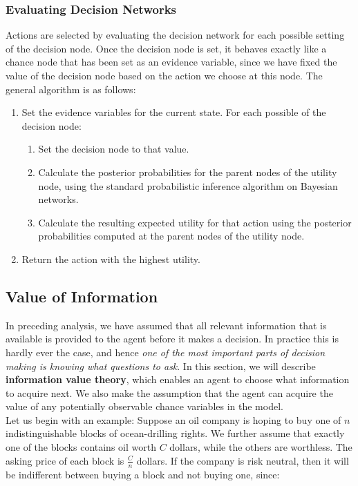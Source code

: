 \documentclass[11pt]{article}
\begin{document}
\subsubsection{Evaluating Decision Networks}

Actions are selected by evaluating the decision network for each possible setting of the decision node. Once the decision node is set, it behaves exactly like a chance node that has been set as an evidence variable, since we have fixed the value of the decision node based on the action we choose at this node. The general algorithm is as follows:

\begin{enumerate}
    \item Set the evidence variables for the current state.
    For each possible of the decision node:
    \begin{enumerate}
        \item Set the decision node to that value.
        \item Calculate the posterior probabilities for the parent nodes of the utility node, using the standard probabilistic inference algorithm on Bayesian networks.
        \item Calculate the resulting expected utility for that action using the posterior probabilities computed at the parent nodes of the utility node.
    \end{enumerate}
    \item Return the action with the highest utility.
\end{enumerate}

\subsection{Value of Information}
In preceding analysis, we have assumed that all relevant information that is available is provided to the agent before it makes a decision. In practice this is hardly ever the case, and hence \textit{one of the most important parts of decision making is knowing what questions to ask}. In this section, we will describe \textbf{information value theory}, which enables an agent to choose what information to acquire next. We also make the assumption that the agent can acquire the value of any potentially observable chance variables in the model.\\

Let us begin with an example: Suppose an oil company is hoping to buy one of $n$ indistinguishable blocks of ocean-drilling rights. We further assume that exactly one of the blocks contains oil worth $C$ dollars, while the others are worthless. The asking price of each block is $\frac{C}{n}$ dollars. If the company is risk neutral, then it will be indifferent between buying a block and not buying one, since:
\end{document}

